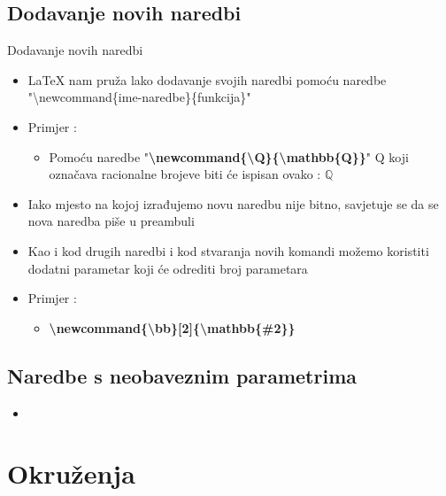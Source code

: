 \documentclass{beamer}
\begin{document}
\subsection{Dodavanje novih naredbi}

\begin{frame}[t]{Dodavanje novih naredbi}
\begin{itemize}
	\item LaTeX nam pruža lako dodavanje svojih naredbi pomoću naredbe "\textbackslash newcommand\{ime-naredbe\}\{funkcija\}"
	\item Primjer :
	\begin{itemize}
		\newcommand{\Q}{\mathbb{Q}} 
		\item Pomoću naredbe "\textbf{\textbackslash newcommand\{\textbackslash Q\}\{\textbackslash mathbb\{Q\}\}}" Q koji označava racionalne brojeve biti će ispisan ovako : \( \Q \)
	\end{itemize}
	\item Iako mjesto na kojoj izrađujemo novu naredbu nije bitno, savjetuje se da se nova naredba piše u preambuli	 
	\item Kao i kod drugih naredbi i kod stvaranja novih komandi možemo koristiti dodatni parametar koji će odrediti broj parametara 
	\item Primjer :
		\begin{itemize}
			\item \textbf{\textbackslash newcommand\{\textbackslash bb\}{[}2{]}\{\textbackslash mathbb\{\#2\}\}}
		\end{itemize}	
\end{itemize}	
\end{frame}

\subsection{Naredbe s neobaveznim parametrima}

\begin{frame}
\begin{itemize}
	\item 
\end{itemize}	
\end{frame}

\section{Okruženja}
\end{document}
